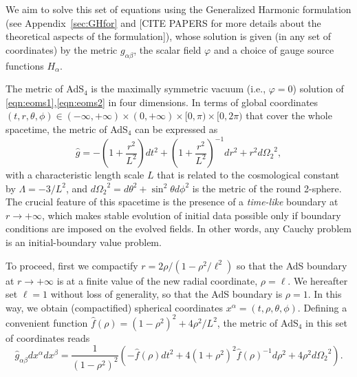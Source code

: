 \documentclass[a4paper,11pt]{article}
\numberwithin{equation}{section}
\begin{document}
We aim to solve this set of equations using the Generalized Harmonic formulation (see Appendix~\ref{sec:GHfor}
and [CITE PAPERS for more details about the theoretical aspects of the formulation]), 
whose solution is given (in any set of coordinates) by the metric $g_{\alpha\beta}$, the scalar field $\varphi$ and a  choice of gauge source functions $H_\alpha$. 

The metric of AdS$_4$ is the maximally symmetric vacuum (i.e., $\varphi=0$) solution of \eqref{eqn:eoms1},\eqref{eqn:eoms2} in four dimensions.
In terms of global coordinates $(t,r,\theta,\phi)\in(-\infty,+\infty)\times(0,+\infty)\times[0,\pi)\times[0,2\pi)$ that cover the whole spacetime, the metric of AdS$_4$ can be expressed as
\begin{equation}\label{eqn:ads4}
\hat{g}= -\left(1+\frac{r^2}{L^2}\right) dt^2 + \left(1+\frac{r^2}{L^2}\right)^{-1} dr^2 +r^2 d{\Omega_2}^2 , \nonumber
\end{equation}
with a characteristic length scale $L$ that is related to the cosmological constant by $\Lambda = - 3/L^2$, and $d{\Omega_2}^2 = d\theta^2 + \sin^2\theta d\phi^2$ is the metric of the round 2-sphere. The crucial feature of this spacetime is the presence of a \emph{time-like} boundary at $r \rightarrow +\infty$, which makes stable evolution of initial data possible only if boundary conditions are imposed on the evolved fields. In other words, any Cauchy problem is an initial-boundary value problem.

To proceed, first we compactify $r=2\rho/(1-\rho^2/\ell^2)$ so that the AdS boundary at $r \rightarrow +\infty$ is at a finite value of the new radial coordinate, $\rho=\ell$.
We hereafter set $\ell=1$ without loss of generality, so that the AdS boundary is $\rho=1$. In this way, we obtain (compactified) spherical coordinates $x^\alpha=(t,\rho,\theta,\phi)$.
Defining a convenient function $\hat{f}(\rho) = (1-\rho^2)^2+4\rho^2/L^2$, the metric of AdS$_4$ in this set of coordinates reads
\begin{equation}\label{eqn:ads4_compact}
\hat{g}_{\alpha\beta}dx^{\alpha}dx^{\beta} = \frac{1}{(1-\rho^2)^2} \left( -\hat{f}(\rho) dt^2 + 4(1+\rho^2)^2 \hat{f}(\rho)^{-1} d\rho^2 + 4\rho^2 d{\Omega_2}^2 \right). \nonumber
\end{equation}
\end{document}
